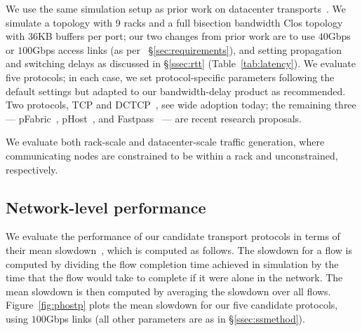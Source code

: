 We use the same simulation setup as prior work on datacenter transports~\cite{pfabric, phost,dctcp}. 
We simulate a %
topology with 9 racks and a full bisection bandwidth Clos topology with $36$KB buffers per port; our two changes from prior work are to use $40$Gbps or $100$Gbps access links (as per ~\S\ref{sec:requirements}), and setting propagation and switching delays as discussed in \S\ref{ssec:rtt} (Table~\ref{tab:latency}).
We evaluate five protocols; in each case, we set protocol-specific parameters following the default settings but adapted to our bandwidth-delay product as recommended. Two protocols, TCP and DCTCP~\cite{dctcp}, see wide adoption today; the remaining three --- pFabric~\cite{pfabric}, pHost~\cite{phost}, and Fastpass~\cite{fastpass} --- are recent research proposals.

We evaluate both rack-scale and datacenter-scale traffic generation, where communicating nodes are constrained to be within a rack and unconstrained, respectively.

\subsection{Network-level performance}
\label{ssec:nlp}
We evaluate the performance of our candidate transport protocols in terms of their  mean slowdown~\cite{pfabric}, which is computed as follows. The slowdown for a flow is computed by dividing the flow completion time achieved in simulation by the time that the flow would take to complete if it were alone in the network. The mean slowdown is then computed by averaging the slowdown over all flows.
Figure~\ref{fig:phostp} plots the mean slowdown for our five candidate protocols, using $100$Gbps links (all other parameters are as in \S\ref{ssec:ssmethod}). 

